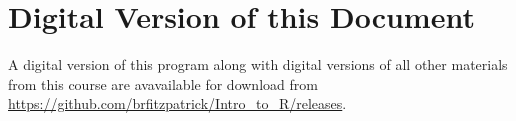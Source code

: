 \documentclass{article}[12pt]
\begin{document}
\section*{Digital Version of this Document}
A digital version of this program along with digital versions of all other materials from this course are avavailable for download from \url{https://github.com/brfitzpatrick/Intro_to_R/releases}.
\end{document}
